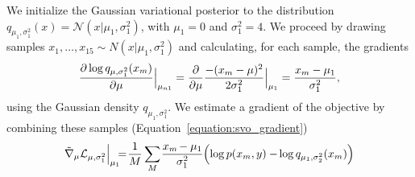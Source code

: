 We initialize the Gaussian variational posterior to the distribution
$q_{\mu_1, \sigma_1^2}(x) = \mathcal{N}(x | \mu_{1}, \sigma_{1}^2)$,
with $\mu_1=0$ and $\sigma_1^2=4$. We proceed by drawing samples $x_1,
\ldots, x_{15} \sim N(x | \mu_1, \sigma_1^2)$ and calculating, for each
sample, the gradients
\begin{align}
  \label{equation:gaussian_mean_gradient}
  \frac{\partial \log q_{\mu, \sigma_1^2}(x_m)}{\partial \mu} \Bigr|_{\mu_{n1}}
  = \frac{\partial }{\partial \mu} \frac{-(x_m - \mu)^2}{2 \sigma_1^2} \Bigr|_{\mu_{1}}
  = \frac{x_m - \mu_1}{\sigma_1^2},
\end{align}
using the Gaussian density $q_{\mu_1, \sigma_1^2}$.  We
estimate a gradient of the objective by combining these samples
(Equation~\ref{equation:svo_gradient})
\begin{align}
  {\tilde \nabla_{ \mu}{ \mathcal{L}_{\mu, \sigma_1^2}}} \Bigr|_{\mu_{1}} &
  \hspace{-5pt} = \hspace{-2pt} \frac{1}{M} \sum_M \hspace{-1pt}\frac{x_m\hspace{-1pt}-\mu_1}{\sigma^2_1}
  \hspace{-2pt} \left( \log p(x_m, y)-\hspace{-1pt} \log q_{\mu_1, \sigma_2^2}(x_m) \right) \\ \nonumber
\end{align}

